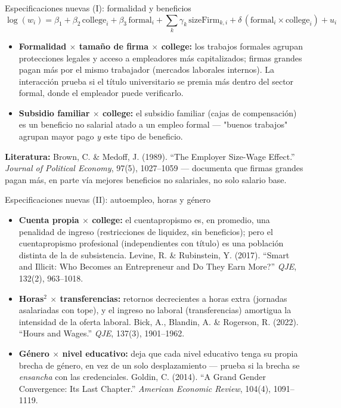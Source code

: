\documentclass[aspectratio=169]{beamer}
\begin{document}
\begin{frame}{Especificaciones nuevas (I): formalidad y beneficios}
  \[
    \log(w_i) = \beta_1 + \beta_2\,\text{college}_i + \beta_3\,\text{formal}_i
      + \sum_k \gamma_k\,\text{sizeFirm}_{k,i} + \delta\,(\text{formal}_i \times \text{college}_i) + u_i
  \]
  \begin{itemize}
    \item \textbf{Formalidad $\times$ tamaño de firma $\times$ college:} los
      trabajos formales agrupan protecciones legales y acceso a empleadores
      más capitalizados; firmas grandes pagan más por el mismo trabajador
      (mercados laborales internos). La interacción prueba si el título
      universitario se premia más dentro del sector formal, donde el empleador
      puede verificarlo.
    \item \textbf{Subsidio familiar $\times$ college:} el subsidio familiar
      (cajas de compensación) es un beneficio no salarial atado a un empleo
      formal --- "buenos trabajos" agrupan mayor pago \emph{y} este tipo de
      beneficio.
  \end{itemize}
  \vfill
  {\footnotesize \textbf{Literatura:} Brown, C. \& Medoff, J. (1989). ``The
  Employer Size-Wage Effect.'' \emph{Journal of Political Economy}, 97(5),
  1027--1059 --- documenta que firmas grandes pagan más, en parte vía mejores
  beneficios no salariales, no solo salario base.}
\end{frame}

\begin{frame}{Especificaciones nuevas (II): autoempleo, horas y género}
  \begin{itemize}
    \item \textbf{Cuenta propia $\times$ college:} el cuentapropismo es, en
      promedio, una penalidad de ingreso (restricciones de liquidez, sin
      beneficios); pero el cuentapropismo profesional (independientes con
      título) es una población distinta de la de subsistencia.
      {\footnotesize Levine, R. \& Rubinstein, Y. (2017). ``Smart and Illicit:
      Who Becomes an Entrepreneur and Do They Earn More?'' \emph{QJE}, 132(2),
      963--1018.}
    \item \textbf{Horas$^2$ $\times$ transferencias:} retornos decrecientes a
      horas extra (jornadas asalariadas con tope), y el ingreso no laboral
      (transferencias) amortigua la intensidad de la oferta laboral.
      {\footnotesize Bick, A., Blandin, A. \& Rogerson, R. (2022). ``Hours and
      Wages.'' \emph{QJE}, 137(3), 1901--1962.}
    \item \textbf{Género $\times$ nivel educativo:} deja que cada nivel
      educativo tenga su propia brecha de género, en vez de un solo
      desplazamiento --- prueba si la brecha se \emph{ensancha} con las
      credenciales.
      {\footnotesize Goldin, C. (2014). ``A Grand Gender Convergence: Its Last
      Chapter.'' \emph{American Economic Review}, 104(4), 1091--1119.}
  \end{itemize}
\end{frame}
\end{document}
